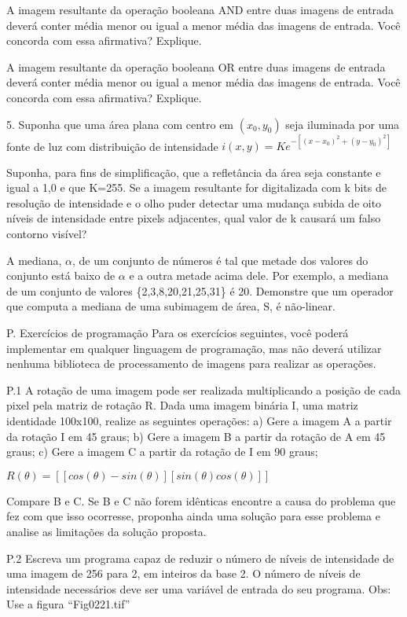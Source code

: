 \documentclass[12pt,a4paper]{article}
\begin{document}
A imagem resultante da operação booleana AND entre duas imagens de entrada deverá conter média menor ou igual a menor média das imagens de entrada. Você concorda com essa afirmativa? Explique.

A imagem resultante da operação booleana OR entre duas imagens de entrada deverá conter média menor ou igual a menor média das imagens de entrada. Você concorda com essa afirmativa? Explique.


5. Suponha que uma área plana com centro em $({x_0},{y_0})$ seja iluminada por
uma fonte de luz com distribuição de intensidade 
$i(x,y) = Ke^{-[(x-{x_0})^{2}+(y-{y_0})^{2}]}$

Suponha, para fins de simplificação, que a refletância da área seja constante e
igual a 1,0 e que K=255. Se a imagem resultante for digitalizada com k bits de
resolução de intensidade e o olho puder detectar uma mudança subida de oito
níveis de intensidade entre pixels adjacentes, qual valor de k causará um falso
contorno visível?


A mediana, $\alpha$, de um conjunto de números é tal que metade dos valores do
conjunto está baixo de $\alpha$ e a outra metade acima dele. Por exemplo, a
mediana de um conjunto de valores \{2,3,8,20,21,25,31\} é 20. Demonstre que um
operador que computa a mediana de uma subimagem de área, S, é não-linear.



P. Exercícios de programação
Para os exercícios seguintes, você poderá implementar em qualquer linguagem de programação, mas não deverá utilizar nenhuma biblioteca de processamento de imagens para realizar as operações.

P.1 A rotação de uma imagem pode ser realizada multiplicando a posição de cada pixel pela matriz de rotação R. Dada uma imagem binária I, uma matriz identidade 100x100, realize as seguintes operações:
    a) Gere a imagem A a partir da rotação I em 45 graus;
    b) Gere a imagem B a partir da rotação de A em 45 graus;
    c) Gere a imagem C a partir da rotação de I em 90 graus;

$R(\theta) = [[cos(\theta) -sin(\theta)][sin(\theta) cos(\theta)]]$

Compare B e C. Se B e C não forem idênticas encontre a causa do problema que fez com que isso ocorresse, proponha ainda uma solução para esse problema e analise as limitações da solução proposta.


P.2 Escreva um programa capaz de reduzir o número de níveis de intensidade de uma imagem de 256 para 2, em inteiros da base 2. O número de níveis de intensidade necessários deve ser uma variável de entrada do seu programa. Obs: Use a figura “Fig0221.tif”
\end{document}
